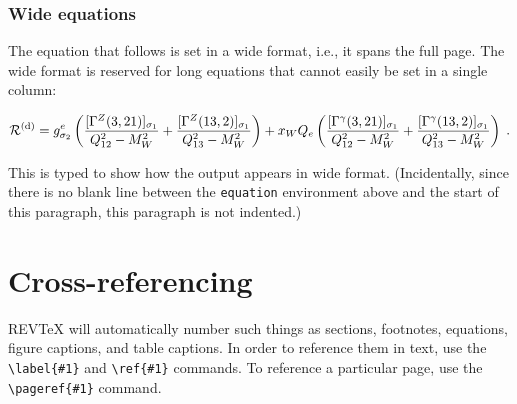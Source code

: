 \documentclass[%
reprint,
amsmath,amssymb,
aps,
]{revtex4-2}
\begin{document}
		\subsubsection{Wide equations}
		The equation that follows is set in a wide format, i.e., it spans the full page. 
		The wide format is reserved for long equations
		that cannot easily be set in a single column:
		\begin{widetext}
			\begin{equation}
				{\cal R}^{(\text{d})}=
				g_{\sigma_2}^e
				\left(
				\frac{[\Gamma^Z(3,21)]_{\sigma_1}}{Q_{12}^2-M_W^2}
				+\frac{[\Gamma^Z(13,2)]_{\sigma_1}}{Q_{13}^2-M_W^2}
				\right)
				+ x_WQ_e
				\left(
				\frac{[\Gamma^\gamma(3,21)]_{\sigma_1}}{Q_{12}^2-M_W^2}
				+\frac{[\Gamma^\gamma(13,2)]_{\sigma_1}}{Q_{13}^2-M_W^2}
				\right)\;. 
				\label{eq:wideeq}
			\end{equation}
		\end{widetext}
		This is typed to show how the output appears in wide format.
		(Incidentally, since there is no blank line between the \texttt{equation} environment above 
		and the start of this paragraph, this paragraph is not indented.)
		
		\section{Cross-referencing}
		REV\TeX{} will automatically number such things as
		sections, footnotes, equations, figure captions, and table captions. 
		In order to reference them in text, use the
		\verb+\label{#1}+ and \verb+\ref{#1}+ commands. 
		To reference a particular page, use the \verb+\pageref{#1}+ command.
		
\end{document}
